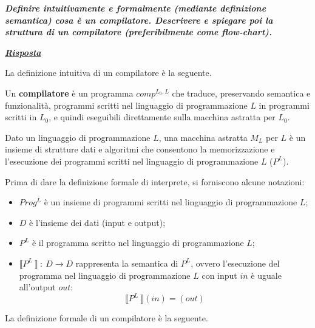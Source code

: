\documentclass[a4paper]{article}
\newcommand{\exec}[1]{\llbracket #1\:\rrbracket}
\begin{document}
	\noindent
	\textcolor{Red3}{\textbf{\emph{Definire intuitivamente e formalmente (mediante definizione semantica) cosa è un compilatore. Descrivere e spiegare poi la struttura di un compilatore (preferibilmente come flow-chart).}}}\newline
	
	\noindent
	\textcolor{Green4}{\textbf{\emph{\underline{Risposta}}}}\newline
	
	\noindent
	La definizione intuitiva di un compilatore è la seguente.
	
	Un \textbf{compilatore} è un programma $comp^{L_{0},L}$ che traduce, preservando semantica e funzionalità, programmi scritti nel linguaggio di programmazione $L$ in programmi scritti in $L_{0}$, e quindi eseguibili direttamente sulla macchina astratta per $L_{0}$.\newline
	
	\noindent
	Dato un linguaggio di programmazione $L$, una macchina astratta $M_{L}$ per $L$ è un insieme di strutture dati e algoritmi che consentono la memorizzazione e l'esecuzione dei programmi scritti nel linguaggio di programmazione $L$ ($P^{L}$).\newline
	
	\noindent
	Prima di dare la definizione formale di interprete, si forniscono alcune notazioni:
	\begin{itemize}
		\item $Prog^{L}$ è un insieme di programmi scritti nel linguaggio di programmazione $L$;
		\item $D$ è l'insieme dei dati (input e output);
		\item $P^{L}$ è il programma scritto nel linguaggio di programmazione $L$;
		\item $\exec{P^{L}} \: : \: D \rightarrow D$ rappresenta la semantica di $P^{L}$, ovvero l'esecuzione del programma nel linguaggio di programmazione $L$ con input $in$ è uguale all'output $out$:
		\begin{equation*}
			\exec{P^{L}}(in) = (out)
		\end{equation*}
	\end{itemize}
	La definizione formale di un compilatore è la seguente.
	
\end{document}

